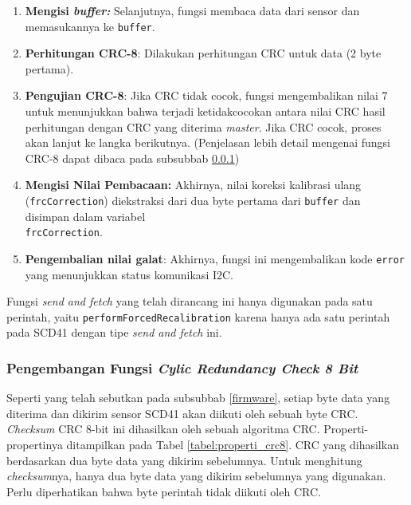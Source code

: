 \begin{enumerate}
            \item \textbf{Mengisi \textit{buffer:}} Selanjutnya, fungsi membaca data dari sensor dan memasukannya ke \texttt{buffer}.
            
            \item \textbf{Perhitungan CRC-8}: Dilakukan perhitungan CRC untuk data (2 byte pertama).
            
            \item \textbf{Pengujian CRC-8}: Jika CRC tidak cocok, fungsi mengembalikan nilai 7 untuk menunjukkan bahwa terjadi ketidakcocokan antara nilai CRC hasil perhitungan dengan CRC yang diterima \textit{master}. Jika CRC cocok, proses akan lanjut ke langka berikutnya. (Penjelasan lebih detail mengenai fungsi CRC-8 dapat dibaca pada subsubbab \ref{CRC})
            
            \item \textbf{Mengisi Nilai Pembacaan:} Akhirnya, nilai koreksi kalibrasi ulang (\texttt{frcCorrection}) diekstraksi dari dua byte pertama dari \texttt{buffer} dan disimpan dalam variabel \\ \texttt{frcCorrection}.

            \item \textbf{Pengembalian nilai galat}: Akhirnya, fungsi ini mengembalikan kode \texttt{error} yang menunjukkan status komunikasi I2C.
            
        \end{enumerate}

    Fungsi \textit{send and fetch} yang telah dirancang ini hanya digunakan pada satu perintah, yaitu \texttt{performForcedRecalibration} karena hanya ada satu perintah pada SCD41 dengan tipe \textit{send and fetch} ini.
        
        \subsubsection{Pengembangan Fungsi \textit{Cylic Redundancy Check 8 Bit}} \label {CRC}
        
        
        Seperti yang telah sebutkan pada subsubbab \ref{firmware}, setiap byte data yang diterima dan dikirim sensor SCD41 akan diikuti oleh sebuah byte CRC. \textit{Checksum} CRC 8-bit ini dihasilkan oleh sebuah algoritma CRC. Properti-propertinya ditampilkan pada Tabel \ref{tabel:properti_crc8}. CRC yang dihasilkan berdasarkan dua byte data yang dikirim sebelumnya. Untuk menghitung \textit{checksum}nya, hanya dua byte data yang dikirim sebelumnya yang digunakan. Perlu diperhatikan bahwa byte perintah tidak diikuti oleh CRC.

